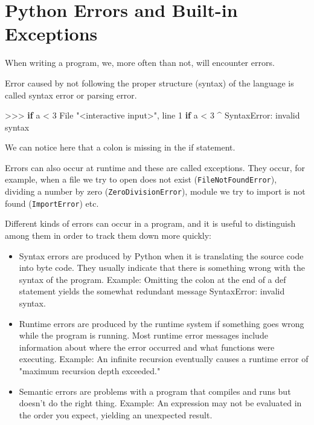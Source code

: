 \documentclass[11pt]{article}
\providecommand{\tightlist}{%
      \setlength{\itemsep}{0pt}\setlength{\parskip}{0pt}}
\newenvironment{Shaded}{}{}
\newcommand{\DecValTok}[1]{\textcolor[rgb]{0.25,0.63,0.44}{{#1}}}
\newcommand{\StringTok}[1]{\textcolor[rgb]{0.25,0.44,0.63}{{#1}}}
\newcommand{\NormalTok}[1]{{#1}}
\newcommand{\ControlFlowTok}[1]{\textcolor[rgb]{0.00,0.44,0.13}{\textbf{{#1}}}}
\newcommand{\OperatorTok}[1]{\textcolor[rgb]{0.40,0.40,0.40}{{#1}}}
\newcommand{\PreprocessorTok}[1]{\textcolor[rgb]{0.74,0.48,0.00}{{#1}}}
\begin{document}
    \section{Python Errors and Built-in
Exceptions}\label{python-errors-and-built-in-exceptions}

When writing a program, we, more often than not, will encounter errors.

Error caused by not following the proper structure (syntax) of the
language is called syntax error or parsing error.

\begin{Shaded}
\begin{Highlighting}[]
\OperatorTok{>>>} \ControlFlowTok{if}\NormalTok{ a }\OperatorTok{<} \DecValTok{3}
\NormalTok{  File }\StringTok{"<interactive input>"}\NormalTok{, line }\DecValTok{1}
    \ControlFlowTok{if}\NormalTok{ a }\OperatorTok{<} \DecValTok{3}
           \OperatorTok{^}
\PreprocessorTok{SyntaxError}\NormalTok{: invalid syntax}
\end{Highlighting}
\end{Shaded}

We can notice here that a colon is missing in the if statement.

Errors can also occur at runtime and these are called exceptions. They
occur, for example, when a file we try to open does not exist
(\texttt{FileNotFoundError}), dividing a number by zero
(\texttt{ZeroDivisionError}), module we try to import is not found
(\texttt{ImportError}) etc.

Different kinds of errors can occur in a program, and it is useful to
distinguish among them in order to track them down more quickly:

\begin{itemize}
\tightlist
\item
  Syntax errors are produced by Python when it is translating the source
  code into byte code. They usually indicate that there is something
  wrong with the syntax of the program. Example: Omitting the colon at
  the end of a def statement yields the somewhat redundant message
  SyntaxError: invalid syntax.
\item
  Runtime errors are produced by the runtime system if something goes
  wrong while the program is running. Most runtime error messages
  include information about where the error occurred and what functions
  were executing. Example: An infinite recursion eventually causes a
  runtime error of "maximum recursion depth exceeded."
\item
  Semantic errors are problems with a program that compiles and runs but
  doesn't do the right thing. Example: An expression may not be
  evaluated in the order you expect, yielding an unexpected result.
\end{itemize}
\end{document}
